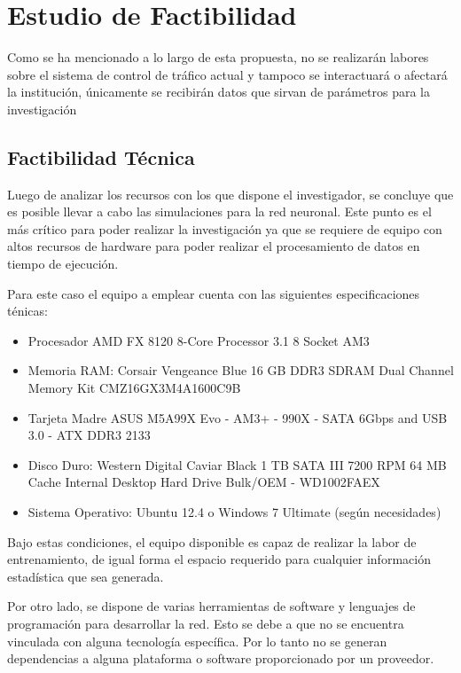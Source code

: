 \chapter{Estudio de Factibilidad}
	\label{chap:fact}
	
	Como se ha mencionado a lo largo de esta propuesta, no se realizar\'{a}n
labores sobre el sistema de control de  tr\'{a}fico actual y tampoco se
interactuar\'{a} o afectar\'{a} la instituci\'{o}n, \'{u}nicamente
se recibir\'{a}n datos que sirvan de par\'{a}metros para la investigaci\'{o}n
	
	\section{Factibilidad T\'{e}cnica}
	
	Luego de analizar los recursos con los que dispone el investigador, se concluye
que es posible llevar a cabo las simulaciones para la red neuronal. Este punto
es el m\'{a}s cr\'{i}tico para poder realizar la investigaci\'{o}n ya que se
requiere de equipo con altos recursos de hardware para poder realizar el
procesamiento de datos en tiempo de ejecuci\'{o}n.
	
	Para este caso el equipo a emplear cuenta con las siguientes especificaciones
	t\'{e}nicas:
	\begin{itemize}
	  \item Procesador AMD FX 8120 8-Core Processor 3.1 8 Socket AM3
	  \item Memoria RAM: Corsair Vengeance Blue 16 GB DDR3 SDRAM Dual Channel
	  Memory Kit CMZ16GX3M4A1600C9B
	  \item Tarjeta Madre ASUS M5A99X Evo - AM3+ - 990X - SATA 6Gbps and USB 3.0 -
	  ATX DDR3 2133
	  \item Disco Duro: Western Digital Caviar Black 1 TB SATA III 7200 RPM 64 MB
	  Cache Internal Desktop Hard Drive Bulk/OEM - WD1002FAEX
	  \item Sistema Operativo: Ubuntu 12.4 o Windows 7 Ultimate (seg\'{u}n
	  necesidades)
	  
	\end{itemize}
	
	Bajo estas condiciones, el equipo disponible es capaz de realizar la labor de
entrenamiento, de igual forma el espacio requerido para cualquier
informaci\'{o}n estad\'{i}stica que sea generada. 

	Por otro lado, se dispone de varias herramientas de software y lenguajes de
programaci\'{o}n para desarrollar la red. Esto se debe a que no se
encuentra vinculada con alguna tecnolog\'{i}a espec\'{i}fica. Por lo tanto no
se generan dependencias a alguna plataforma o software proporcionado por un
proveedor.
	
